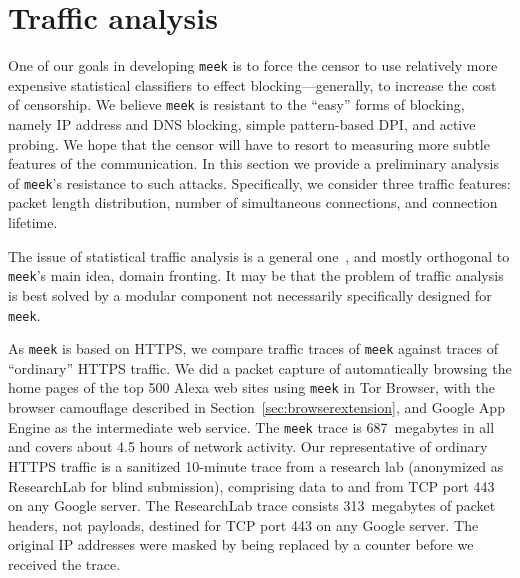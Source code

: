 \documentclass[conference]{IEEEtran}
\newcommand{\meek}{\texttt{meek}\xspace}
\newcommand{\lbl}{ResearchLab\xspace}
\begin{document}
\section{Traffic analysis}
\label{sec:trafficanalysis}

One of our goals in developing \meek is to force
the censor to use relatively more expensive statistical classifiers
to effect blocking---generally, to increase the cost of censorship.
We believe \meek is resistant to the ``easy''
forms of blocking, namely IP address and DNS blocking,
simple pattern-based DPI,
and active probing.
We hope that the censor will have to resort to measuring
more subtle features of the communication.
In this section we provide a preliminary analysis
of \meek's resistance to such attacks.
Specifically, we consider three traffic features:
packet length distribution,
number of simultaneous connections,
and connection lifetime.

The issue of statistical traffic analysis is a general one~\cite{trafficmorphing},
and mostly orthogonal to \meek's main idea, domain fronting.
It may be that the problem of traffic analysis is
best solved by a modular component not
necessarily specifically designed for \meek.

As \meek is based on HTTPS,
we compare traffic traces of \meek against
traces of ``ordinary'' HTTPS traffic.
We did a packet capture
of automatically browsing the home pages
of the top 500 Alexa web sites using \meek in Tor Browser,
with the browser camouflage described in Section~\ref{sec:browserextension},
and Google App Engine as the intermediate web service.
The \meek trace is 687~megabytes in all
and covers about 4.5 hours of network activity.
Our representative of ordinary HTTPS traffic
is a sanitized 10-minute trace
from 
a research lab (anonymized as \lbl for blind submission),
comprising data to and from TCP port 443 on any Google server.
The \lbl trace consists 313~megabytes of packet headers,
not payloads, destined for TCP port 443 on any Google server.
The original IP addresses were masked by being
replaced by a counter before we received the trace.
\end{document}
